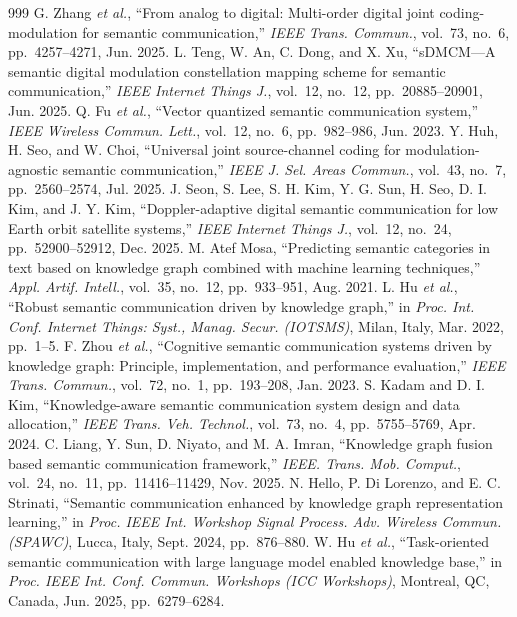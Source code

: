 \begin{thebibliography}{999}
 G. Zhang \emph{et al.}, ``From analog to digital: Multi-order digital joint coding-modulation for semantic communication,'' \emph{IEEE Trans. Commun.}, vol.~73, no.~6, pp.~4257--4271, Jun. 2025.
 L. Teng, W. An, C. Dong, and X. Xu, ``sDMCM---A semantic digital modulation constellation mapping scheme for semantic communication,'' \emph{IEEE Internet Things J.}, vol.~12, no.~12, pp.~20885--20901, Jun. 2025.
 Q. Fu \emph{et al.}, ``Vector quantized semantic communication system,'' \emph{IEEE Wireless Commun. Lett.}, vol.~12, no.~6, pp.~982--986, Jun. 2023.
 Y. Huh, H. Seo, and W. Choi, ``Universal joint source-channel coding for modulation-agnostic semantic communication,'' \emph{IEEE J. Sel. Areas Commun.}, vol.~43, no.~7, pp.~2560--2574, Jul. 2025.
 J. Seon, S. Lee, S. H. Kim, Y. G. Sun, H. Seo, D. I. Kim, and J. Y. Kim, ``Doppler-adaptive digital semantic communication for low Earth orbit satellite systems,'' \emph{IEEE Internet Things J.}, vol.~12, no.~24, pp.~52900--52912, Dec. 2025.
 M. Atef Mosa, ``Predicting semantic categories in text based on knowledge graph combined with machine learning techniques,'' \emph{Appl. Artif. Intell.}, vol.~35, no.~12, pp.~933--951, Aug. 2021.
 L. Hu \emph{et al.}, ``Robust semantic communication driven by knowledge graph,'' in \emph{Proc. Int. Conf. Internet Things: Syst., Manag. Secur. (IOTSMS)}, Milan, Italy, Mar. 2022, pp.~1--5.
 F. Zhou \emph{et al.}, ``Cognitive semantic communication systems driven by knowledge graph: Principle, implementation, and performance evaluation,'' \emph{IEEE Trans. Commun.}, vol.~72, no.~1, pp.~193--208, Jan. 2023.
 S. Kadam and D. I. Kim, ``Knowledge-aware semantic communication system design and data allocation,'' \emph{IEEE Trans. Veh. Technol.}, vol.~73, no.~4, pp.~5755--5769, Apr. 2024.
 C. Liang, Y. Sun, D. Niyato, and M. A. Imran, ``Knowledge graph fusion based semantic communication framework,'' \emph{IEEE. Trans. Mob. Comput.}, vol.~24, no.~11, pp.~11416--11429, Nov. 2025.
 N. Hello, P. Di Lorenzo, and E. C. Strinati, ``Semantic communication enhanced by knowledge graph representation learning,'' in \emph{Proc. IEEE Int. Workshop Signal Process. Adv. Wireless Commun. (SPAWC)}, Lucca, Italy, Sept. 2024, pp.~876--880.
 W. Hu \emph{et al.}, ``Task-oriented semantic communication with large language model enabled knowledge base,'' in \emph{Proc. IEEE Int. Conf. Commun. Workshops (ICC Workshops)}, Montreal, QC, Canada, Jun. 2025, pp.~6279--6284.

\end{thebibliography}
